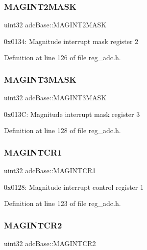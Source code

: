 \subsubsection{\texorpdfstring{M\+A\+G\+I\+N\+T2\+M\+A\+SK}{MAGINT2MASK}}
{\footnotesize\ttfamily uint32 adc\+Base\+::\+M\+A\+G\+I\+N\+T2\+M\+A\+SK}

0x0134\+: Magnitude interrupt mask register 2 

Definition at line 126 of file reg\+\_\+adc.\+h.

\mbox{\label{structadcBase_a71d2d3aa86228a2e8055dd1bc813d4a1}} 
\subsubsection{\texorpdfstring{M\+A\+G\+I\+N\+T3\+M\+A\+SK}{MAGINT3MASK}}
{\footnotesize\ttfamily uint32 adc\+Base\+::\+M\+A\+G\+I\+N\+T3\+M\+A\+SK}

0x013C\+: Magnitude interrupt mask register 3 

Definition at line 128 of file reg\+\_\+adc.\+h.

\mbox{\label{structadcBase_a7ac5e47c3470829c615a4c9eee47db6b}} 
\subsubsection{\texorpdfstring{M\+A\+G\+I\+N\+T\+C\+R1}{MAGINTCR1}}
{\footnotesize\ttfamily uint32 adc\+Base\+::\+M\+A\+G\+I\+N\+T\+C\+R1}

0x0128\+: Magnitude interrupt control register 1 

Definition at line 123 of file reg\+\_\+adc.\+h.

\mbox{\label{structadcBase_a5514fd7e877ed1998d23a51c94e940c0}} 
\subsubsection{\texorpdfstring{M\+A\+G\+I\+N\+T\+C\+R2}{MAGINTCR2}}
{\footnotesize\ttfamily uint32 adc\+Base\+::\+M\+A\+G\+I\+N\+T\+C\+R2}

